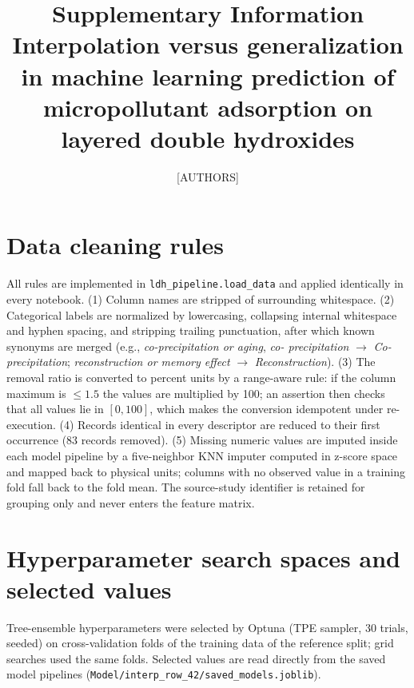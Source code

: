 \documentclass[12pt]{article}
\title{Supplementary Information\\
Interpolation versus generalization in machine learning prediction of
micropollutant adsorption on layered double hydroxides}
\author{[AUTHORS]}
\date{}
\begin{document}
\maketitle

\section{Data cleaning rules}
All rules are implemented in \texttt{ldh\_pipeline.load\_data} and applied
identically in every notebook. (1) Column names are stripped of
surrounding whitespace. (2) Categorical labels are normalized by
lowercasing, collapsing internal whitespace and hyphen spacing, and
stripping trailing punctuation, after which known synonyms are merged
(e.g., \emph{co-precipitation or aging}, \emph{co- precipitation}
$\rightarrow$ \emph{Co-precipitation}; \emph{reconstruction or memory
effect} $\rightarrow$ \emph{Reconstruction}). (3) The removal ratio is
converted to percent units by a range-aware rule: if the column maximum
is $\le 1.5$ the values are multiplied by 100; an assertion then checks
that all values lie in $[0, 100]$, which makes the conversion idempotent
under re-execution. (4) Records identical in every descriptor are
reduced to their first occurrence (83 records removed). (5) Missing
numeric values are imputed inside each model pipeline by a five-neighbor
KNN imputer computed in z-score space and mapped back to physical units;
columns with no observed value in a training fold fall back to the fold
mean. The source-study identifier is retained for grouping only and
never enters the feature matrix.

\section{Hyperparameter search spaces and selected values}

Tree-ensemble hyperparameters were selected by Optuna (TPE sampler, 30
trials, seeded) on cross-validation folds of the training data of the
reference split; grid searches used the same folds. Selected values are
read directly from the saved model pipelines
(\texttt{Model/interp\_row\_42/saved\_models.joblib}).
\end{document}
